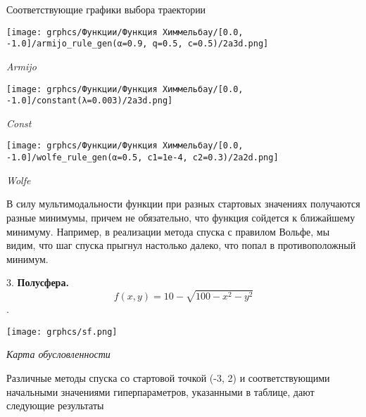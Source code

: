 \documentclass{article}
\begin{document}
Соответствующие графики выбора траектории

\begin{center}
    \texttt{[image: grphcs/Функции/Функция Химмельбау/[0.0, -1.0]/armijo\_rule\_gen(α=0.9, q=0.5, c=0.5)/2a3d.png]}

    { \it Armijo}
\end{center}

\begin{center}
    \texttt{[image: grphcs/Функции/Функция Химмельбау/[0.0, -1.0]/constant(λ=0.003)/2a3d.png]}

    { \it Const}
\end{center}

\begin{center}
    \texttt{[image: grphcs/Функции/Функция Химмельбау/[0.0, -1.0]/wolfe\_rule\_gen(α=0.5, c1=1e-4, c2=0.3)/2a2d.png]}

    { \it Wolfe}
\end{center}

В силу мультимодальности функции при разных стартовых значениях получаются разные минимумы, причем не обязательно, что функция сойдется к ближайшему минимуму. Например, в реализации метода спуска с правилом Вольфе, мы видим, что шаг спуска прыгнул настолько далеко, что попал в противоположный минимум.

\newpage

    3. { \bf Полусфера. }
    $$ f(x, y) = 10 - \sqrt{100 - x^2 - y^2}$$.


    \begin{center}
    \texttt{[image: grphcs/sf.png]}

    { \it Карта обусловленности}
\end{center}

Различные методы спуска со стартовой точкой (-3, 2) и соответствующими начальными значениями гиперпараметров, указанными в таблице, дают следующие результаты
\end{document}
